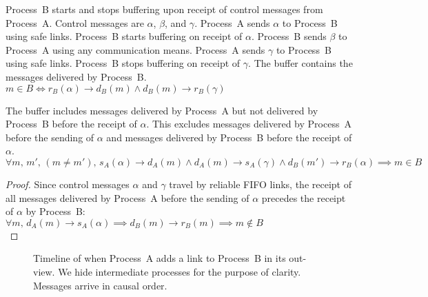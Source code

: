 \begin{definition}
  Process~B starts and stops buffering upon receipt of control messages from
  Process~A. Control messages are $\alpha$, $\beta$, and $\gamma$. Process~A
  sends $\alpha$ to Process~B using safe links. Process~B starts buffering on
  receipt of $\alpha$. Process~B sends $\beta$ to Process~A using any
  communication means. Process~A sends $\gamma$ to Process~B using safe
  links. Process~B stops buffering on receipt of $\gamma$.
  The buffer contains the messages delivered by Process~B. \\
  $m \in B \Longleftrightarrow 
  r_B(\alpha) \rightarrow d_B(m) \wedge d_B(m) \rightarrow r_B(\gamma)$
\end{definition}

\begin{lemma}
  The buffer includes messages delivered by Process~A but not delivered by
  Process~B before the receipt of $\alpha$. This excludes messages delivered by
  Process~A before the sending of $\alpha$ and messages delivered by Process~B
  before the receipt of $\alpha$.\\
  $\forall m,\,m',\,(m\neq m'),\,
  s_A(\alpha) \rightarrow d_A(m) \wedge
  d_A(m) \rightarrow s_A(\gamma) \wedge
  d_B(m') \rightarrow r_B(\alpha) \implies m \in B$
\end{lemma}

\begin{proof}
  Since control messages $\alpha$ and $\gamma$ travel by reliable FIFO links,
  the receipt of all messages delivered by Process~A before the sending of
  $\alpha$ precedes the receipt of $\alpha$ by Process~B:\\
  $\forall m,\, d_A(m) \rightarrow s_A(\alpha) \implies d_B(m) \rightarrow
  r_B(m) \implies m \not\in B$\\
\end{proof}


\begin{figure*}
  \begin{center}
    
    \caption{\label{fig:timeline}Timeline of \RPCBROADCAST when Process~A adds a
      link to Process~B in its out-view. We hide intermediate processes for the
      purpose of clarity. Messages arrive in causal order.}
  \end{center}
\end{figure*}


